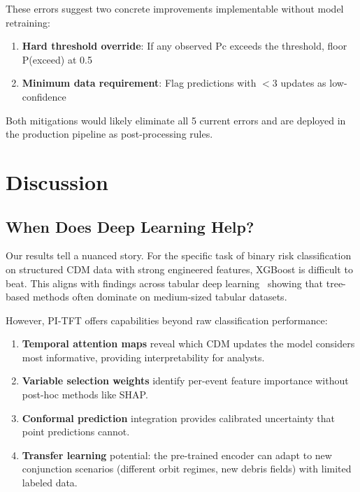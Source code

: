 \documentclass{article}
\begin{document}
These errors suggest two concrete improvements implementable without model retraining:
\begin{enumerate}
\item \textbf{Hard threshold override}: If any observed Pc exceeds the threshold, floor P(exceed) at 0.5
\item \textbf{Minimum data requirement}: Flag predictions with $< 3$ updates as low-confidence
\end{enumerate}

Both mitigations would likely eliminate all 5 current errors and are deployed in the production pipeline as post-processing rules.

\section{Discussion}
\label{sec:discussion}

\subsection{When Does Deep Learning Help?}
\label{sec:when-dl}

Our results tell a nuanced story. For the specific task of binary risk classification on structured CDM data with strong engineered features, XGBoost is difficult to beat. This aligns with findings across tabular deep learning~\citep{grinsztajn2022,mcelfresh2023} showing that tree-based methods often dominate on medium-sized tabular datasets.

However, PI-TFT offers capabilities beyond raw classification performance:

\begin{enumerate}
\item \textbf{Temporal attention maps} reveal which CDM updates the model considers most informative, providing interpretability for analysts.
\item \textbf{Variable selection weights} identify per-event feature importance without post-hoc methods like SHAP.
\item \textbf{Conformal prediction} integration provides calibrated uncertainty that point predictions cannot.
\item \textbf{Transfer learning} potential: the pre-trained encoder can adapt to new conjunction scenarios (different orbit regimes, new debris fields) with limited labeled data.
\end{enumerate}
\end{document}
